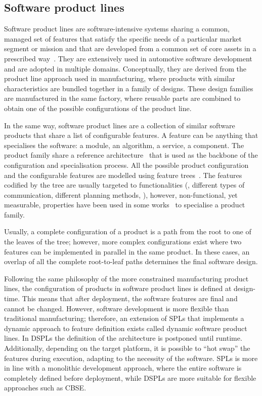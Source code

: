 \subsection{Software product lines}
Software product lines are software-intensive systems sharing a common, managed set of features that satisfy the specific needs of a particular market segment or mission and that are developed from a common set of core assets in a prescribed way~\cite{northrop2002sei}. They are extensively used in automotive software development and are adopted in multiple domains. Conceptually, they are derived from the product line approach used in manufacturing, where products with similar characteristics are bundled together in a family of designs. These design families are manufactured in the same factory, where reusable parts are combined to obtain one of the possible configurations of the product line.

In the same way, software product lines are a collection of similar software products that share a list of configurable features. A feature can be anything that specialises the software: a module, an algorithm, a service, a component. The product family share a reference architecture~\cite{nakagawa2011reference} that is used as the backbone of the configuration and specialisation process. All the possible product configuration and the configurable features are modelled using feature trees~\cite{mendonca2009splot, eriksson2009managing}. The features codified by the tree are usually targeted to functionalities (\eg, different types of communication, different planning methods, \etc), however, non-functional, yet measurable, properties have been used in some works~\cite{benavides2005automated} to specialise a product family.

Usually, a complete configuration of a product is a path from the root to one of the leaves of the tree; however, more complex configurations exist where two features can be implemented in parallel in the same product. In these cases, an overlap of all the complete root-to-leaf paths determines the final software design.

Following the same philosophy of the more constrained manufacturing product lines, the configuration of products in software product lines is defined at design-time. This means that after deployment, the software features are final and cannot be changed. However, software development is more flexible than traditional manufacturing; therefore, an extension of SPLs that implements a dynamic approach to feature definition exists called dynamic software product lines. In DSPLs the definition of the architecture is postponed until runtime. Additionally, depending on the target platform, it is possible to ``hot swap'' the features during execution, adapting to the necessity of the software. SPLs is more in line with a monolithic development approach, where the entire software is completely defined before deployment, while DSPLs are more suitable for flexible approaches such as CBSE.

